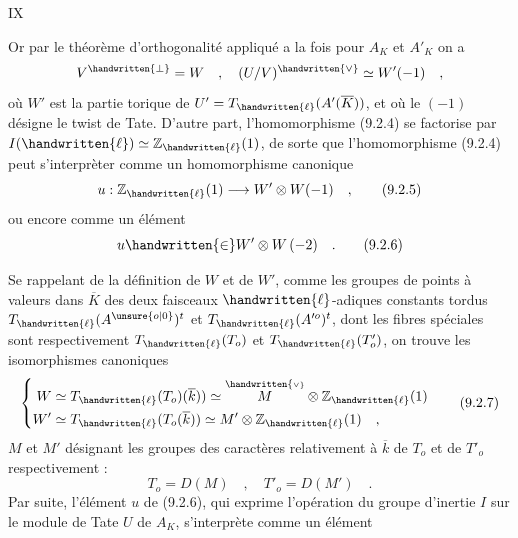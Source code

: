 \hfill IX

Or par le théorème d'orthogonalité appliqué a la fois pour $A_K$ et $A'_K$ on a
\[
V^{\handwritten{\perp}}=W\quad ,\quad (U/V)^{\handwritten{\vee}}\simeq W'(-1)\quad ,
\]
où $W'$ est la partie torique de $U'=T_{\handwritten{\ell}}(A'(\overline K))$, et où le $(-1)$ désigne le twist de Tate. D'autre part, l'homomorphisme (9.2.4) se factorise par $I(\handwritten{\ell})\simeq\mathbb Z_{\handwritten{\ell}}(1)$, de sorte que l'homomorphisme (9.2.4) peut s'interprèter comme un homomorphisme canonique
\[
u:\mathbb Z_{\handwritten{\ell}}(1)\longrightarrow W'\otimes W(-1)\quad ,\tag*{(9.2.5)}
\]
ou encore comme un élément
\[
u\handwritten{\in}W'\otimes W\,(-2)\quad .\tag*{(9.2.6)}
\]

Se rappelant de la définition de $W$ et de $W'$, comme les groupes de points à valeurs dans $\overline K$ des deux faisceaux $\handwritten{\ell}$-adiques constants tordus $T_{\handwritten{\ell}}(A^{\unsure{o|0}})^{t}$ et $T_{\handwritten{\ell}}(A'^{o})^{t}$, dont les fibres spéciales sont respectivement $T_{\handwritten{\ell}}(T_o)$ et $T_{\handwritten{\ell}}(T'_o)$, on trouve les isomorphismes canoniques
\[
\left\{\begin{aligned}
W&\simeq T_{\handwritten{\ell}}(T_o)(\overline k))\simeq\overset{\handwritten{\scriptscriptstyle\vee}}{M}\otimes\mathbb Z_{\handwritten{\ell}}(1)\\
W'&\simeq T_{\handwritten{\ell}}(T_o(\overline k))\simeq M'\otimes\mathbb Z_{\handwritten{\ell}}(1)\quad ,
\end{aligned}\right.\tag*{(9.2.7)}
\]
$M$ et $M'$ désignant les groupes des caractères relativement à $\overline k$ de $T_o$ et de $T'_o$ respectivement :
\[
T_o=D(M)\quad ,\quad T'_o=D(M')\quad .\tag*{(9.2.8)}
\]
Par suite, l'élément $u$ de (9.2.6), qui exprime l'opération du groupe d'inertie $I$ sur le module de Tate $U$ de $A_K$, s'interprète comme un élément

